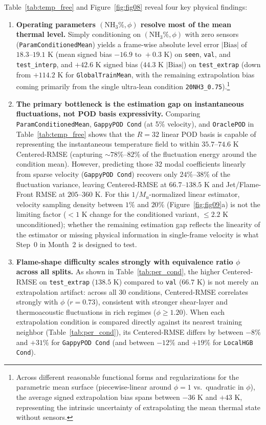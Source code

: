 \documentclass[11pt,letterpaper]{article}
\begin{document}
Table~\ref{tab:temp_free} and Figure~\ref{fig:fig08} reveal four key physical findings:
\begin{enumerate}
    \item \textbf{Operating parameters $(\text{NH}_3\%, \phi)$ resolve most of the mean thermal level.} Simply conditioning on $(\text{NH}_3\%, \phi)$ with zero sensors (\texttt{ParamConditionedMean}) yields a frame-wise absolute level error $|\text{Bias}|$ of $18.3\text{--}19.1\text{ K}$ (mean signed bias $-16.9\text{ to }+0.3\text{ K}$) on \texttt{seen}, \texttt{val}, and \texttt{test\_interp}, and $+42.6\text{ K}$ signed bias ($44.3\text{ K}$ $|\text{Bias}|$) on \texttt{test\_extrap} (down from $+114.2\text{ K}$ for \texttt{GlobalTrainMean}, with the remaining extrapolation bias coming primarily from the single ultra-lean condition \texttt{20NH3\_0.75}).\footnote{Across different reasonable functional forms and regularizations for the parametric mean surface (piecewise-linear around $\phi=1$ vs.\ quadratic in $\phi$), the average signed extrapolation bias spans between $-36\text{ K}$ and $+43\text{ K}$, representing the intrinsic uncertainty of extrapolating the mean thermal state without sensors.}
    \item \textbf{The primary bottleneck is the estimation gap on instantaneous fluctuations, not POD basis expressivity.} Comparing \texttt{ParamConditionedMean}, \texttt{GappyPOD Cond} (at 5\% velocity), and \texttt{OraclePOD} in Table~\ref{tab:temp_free} shows that the $R=32$ linear POD basis is capable of representing the instantaneous temperature field to within $35.7\text{--}74.6\text{ K}$ Centered-RMSE (capturing $\sim 78\%\text{--}82\%$ of the fluctuation energy around the condition mean). However, predicting those 32 modal coefficients linearly from sparse velocity (\texttt{GappyPOD Cond}) recovers only $24\%\text{--}38\%$ of the fluctuation variance, leaving Centered-RMSE at $66.7\text{--}138.5\text{ K}$ and Jet/Flame-Front RMSE at $205\text{--}360\text{ K}$. For this $1/M_u$-normalized linear estimator, velocity sampling density between $1\%$ and $20\%$ (Figure~\ref{fig:fig09}a) is not the limiting factor ($< 1\text{ K}$ change for the conditioned variant, $\le 2.2\text{ K}$ unconditioned); whether the remaining estimation gap reflects the linearity of the estimator or missing physical information in single-frame velocity is what Step~0 in Month~2 is designed to test.
    \item \textbf{Flame-shape difficulty scales strongly with equivalence ratio $\phi$ across all splits.} As shown in Table~\ref{tab:per_cond}, the higher Centered-RMSE on \texttt{test\_extrap} ($138.5\text{ K}$) compared to \texttt{val} ($66.7\text{ K}$) is not merely an extrapolation artifact: across all 30 conditions, Centered-RMSE correlates strongly with $\phi$ ($r = 0.73$), consistent with stronger shear-layer and thermoacoustic fluctuations in rich regimes ($\phi \ge 1.20$). When each extrapolation condition is compared directly against its nearest training neighbor (Table~\ref{tab:per_cond}), its Centered-RMSE differs by between $-8\%$ and $+31\%$ for \texttt{GappyPOD Cond} (and between $-12\%$ and $+19\%$ for \texttt{LocalHGB Cond}).

\end{enumerate}
\end{document}
